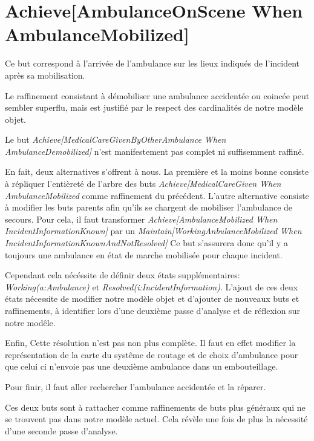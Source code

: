 \section{Achieve[AmbulanceOnScene When AmbulanceMobilized]}
	Ce but correspond à l'arrivée de l'ambulance sur les lieux indiqués
	de l'incident après sa mobilisation.
	
	Le raffinement consistant à démobiliser une ambulance accidentée ou
	coincée peut sembler superflu, mais est justifié par le respect des
	cardinalités de notre modèle objet. 

	Le but \emph{Achieve[MedicalCareGivenByOtherAmbulance When AmbulanceDemobilized]}
	n'est manifestement pas complet ni suffisemment raffiné.
	
	En fait, deux alternatives s'offrent à nous. La première et la moins bonne
	consiste à répliquer l'entièreté de l'arbre des buts \emph{Achieve[MedicalCareGiven When AmbulanceMobilized}
	comme raffinement du précédent. L'autre alternative consiste à modifier
	les buts parents afin qu'ils se chargent de mobiliser l'ambulance de 
	secours. Pour cela, il faut transformer \emph{Achieve[AmbulanceMobilized When IncidentInformationKnown]}
	par un \emph{Maintain[WorkingAnbulanceMobilized When IncidentInformationKnownAndNotResolved]}
	Ce but s'assurera donc qu'il y a toujours une ambulance en état de marche 
	mobilisée pour chaque incident. 
	
	Cependant cela nécéssite de définir deux états supplémentaires:  
	\emph{Working(a:Ambulance)} et \emph{Resolved(i:IncidentInformation)}. 
	L'ajout de ces deux états nécessite de modifier notre modèle objet 
	et d'ajouter de nouveaux buts et raffinements, à identifier lors d'une 
	deuxième passe d'analyse et de réflexion sur notre modêle.

	Enfin, Cette résolution n'est pas non plus complète. Il faut en effet
	modifier la représentation de la carte du systême de routage et de choix
	d'ambulance pour que celui ci n'envoie pas une deuxième ambulance dans
	un embouteillage. 

	Pour finir, il faut aller rechercher l'ambulance accidentée et la 
	réparer. 

	Ces deux buts sont à rattacher comme raffinements de buts plus généraux
	qui ne se trouvent pas dans notre modèle actuel. Cela révèle une fois de
	plus la nécessité d'une seconde passe d'analyse.


